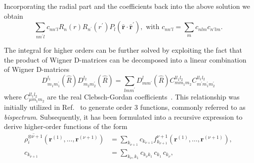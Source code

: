 Incorporating the radial part and the coefficients back into the above solution we obtain
\begin{equation}
  \label{eq:soap}
  \sum_{nn^\prime l} c_{nn'l} R_n(r)R_{n^\prime}(r^\prime) P_l(\hat{\mathbf{r}}\cdot\hat{\mathbf{r}}^\prime),\textrm{ with }c_{nn'l} = \sum_{m} c_{nlm}c_{n'lm}.
\end{equation}

The integral for higher orders can be further solved by exploiting the fact that the product of Wigner D-matrices can be decomposed into a linear combination of Wigner D-matrices
\begin{equation}
  \label{eq:clebsch-gordan}
  D^{l_1}_{m_1m_1^\prime}(\hat{R})D^{l_2}_{m_2m_2^\prime}(\hat{R}) = \sum_{l m m^\prime} D^{l}_{mm^\prime}(\hat{R}) C^{l l_1l_2}_{mm_1m_2}C^{l l_1l_2}_{m^\prime m_1^\prime m_2^\prime}
\end{equation}
where $C^{l l_1l_2}_{\mu m_1m_2}$ are the real Clebsch-Gordan coefficients~\cite{yutsis1965theory,niga+20jcp}.
This relationship was initially utilized in Ref.~\cite{bart+13prb} to generate order 3 functions, commonly referred to as \emph{bispectrum}.
Subsequently, it has been formulated into a recursive expression to derive higher-order functions of the form
\begin{subequations}
\label{eq:recursive_higherorder}
\begin{align}
  \overline{\rho_i^{\otimes\nu+1}}(\mathbf{r}^{(1)}, \ldots, \mathbf{r}^{(\nu+1)}) &= \sum_{k_{\nu+1}} c_{k_{\nu+1}} f^{\nu+1}_{k_{\nu+1}}(\mathbf{r}^{(1)}, \ldots, \mathbf{r}^{(\nu+1)}), \\
  c_{k_{\nu+1}} &= \sum_{k_\nu, k_1} c_{k_\nu k_1}\, c_{k_1}\, c_{k_\nu},
\end{align}
\end{subequations}
